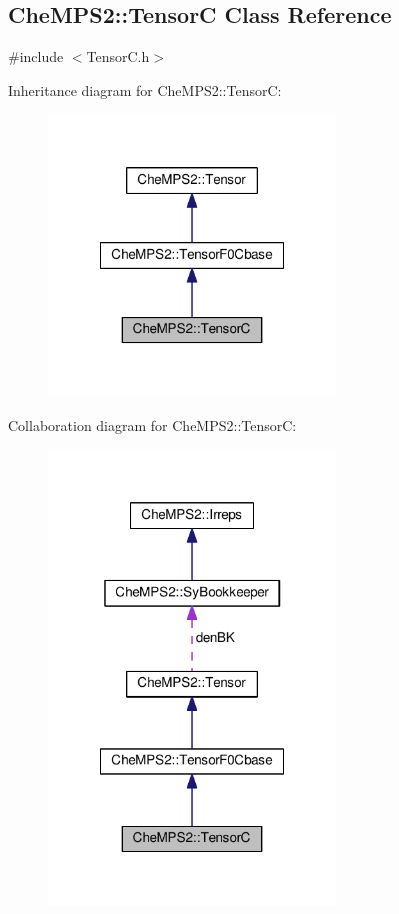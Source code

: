 \hypertarget{classCheMPS2_1_1TensorC}{\subsection{Che\-M\-P\-S2\-:\-:Tensor\-C Class Reference}
\label{classCheMPS2_1_1TensorC}
}


{\ttfamily \#include $<$Tensor\-C.\-h$>$}



Inheritance diagram for Che\-M\-P\-S2\-:\-:Tensor\-C\-:\nopagebreak
\begin{figure}[H]
\begin{center}
\leavevmode
\includegraphics[width=216pt]{classCheMPS2_1_1TensorC__inherit__graph}
\end{center}
\end{figure}


Collaboration diagram for Che\-M\-P\-S2\-:\-:Tensor\-C\-:\nopagebreak
\begin{figure}[H]
\begin{center}
\leavevmode
\includegraphics[width=216pt]{classCheMPS2_1_1TensorC__coll__graph}
\end{center}
\end{figure}
